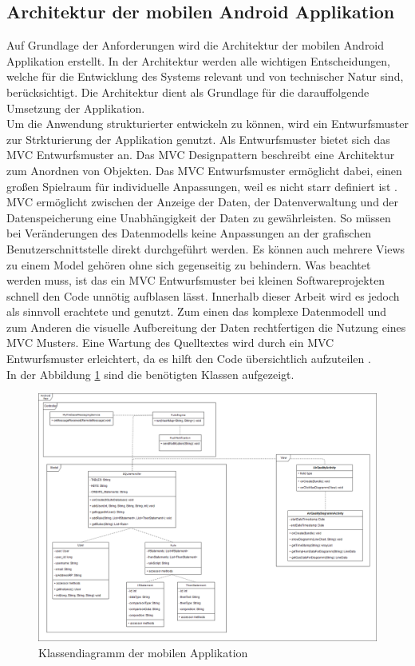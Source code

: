 \subsection{Architektur der mobilen Android Applikation}
Auf Grundlage der Anforderungen wird die Architektur der mobilen Android Applikation erstellt.
In der Architektur werden alle wichtigen Entscheidungen, welche für die Entwicklung des Systems relevant und von technischer Natur sind, berücksichtigt. Die Architektur dient als Grundlage für die darauffolgende Umsetzung der Applikation.\\
Um die Anwendung strukturierter entwickeln zu können, wird ein Entwurfsmuster zur Strkturierung der Applikation genutzt. Als Entwurfsmuster bietet sich das \ac{MVC} Entwurfsmuster an. Das \ac{MVC} Designpattern beschreibt eine Architektur zum Anordnen von Objekten. Das \ac{MVC} Entwurfsmuster ermöglicht dabei, einen großen Spielraum für individuelle Anpassungen, weil es nicht starr definiert ist \cite{bucanek:modelviewcontroller}.\\
MVC ermöglicht zwischen der Anzeige der Daten, der Datenverwaltung und der Datenspeicherung eine Unabhängigkeit der Daten zu gewährleisten. So müssen bei Veränderungen des Datenmodells keine Anpassungen an der grafischen Benutzerschnittstelle direkt durchgeführt werden. Es können auch mehrere Views zu einem Model gehören ohne sich gegenseitig zu behindern. Was beachtet werden muss, ist das ein \ac{MVC} Entwurfsmuster bei kleinen Softwareprojekten schnell den Code unnötig aufblasen lässt. Innerhalb dieser Arbeit wird es jedoch als sinnvoll erachtete und genutzt. Zum einen das komplexe Datenmodell und zum Anderen die visuelle Aufbereitung der Daten rechtfertigen die Nutzung eines MVC Musters. Eine Wartung des Quelltextes wird durch ein \ac{MVC} Entwurfsmuster erleichtert, da es hilft den Code übersichtlich aufzuteilen \cite{bucanek:modelviewcontroller}.\\
In der Abbildung \ref{fig:klassendiagramm} sind die benötigten Klassen aufgezeigt.\\
\begin{figure}[h]
	\centering
	\includegraphics[width=1\textwidth]{images/Klassendiagramm.png}
	\caption{Klassendiagramm der mobilen Applikation}
	\label{fig:klassendiagramm}
\end{figure}
